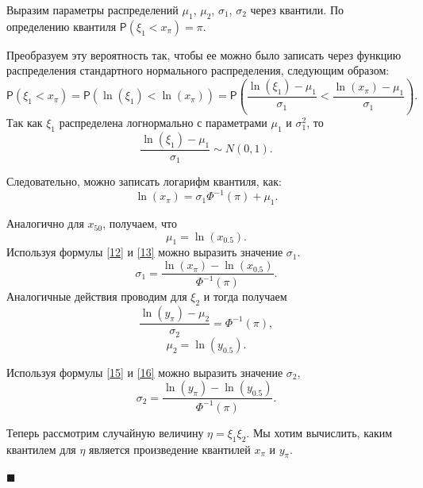 \documentclass[12pt]{article}
\newenvironment{Proof}{\par\noindent{\bf Доказательство.}}{\hfill$\scriptstyle\blacksquare$}
\begin{document}
	\begin{Proof}
		Выразим параметры распределений $\mu_{1}$, $\mu_{2}$, $\sigma_{1}$, $\sigma_{2}$ через квантили.
		По определению квантиля $\mathsf{P}(\xi_{1}<x_{\pi}) = \pi$.
		
		Преобразуем эту вероятность так, чтобы ее можно было записать через функцию распределения стандартного нормального распределения, следующим образом:
		\begin{equation*}
			\mathsf{P}(\xi_{1}<x_{\pi}) = \mathsf{P}(\ln(\xi_{1})<\ln(x_{\pi})) = \mathsf{P}\left(\dfrac{\ln(\xi_{1})-\mu_{1}}{\sigma_{1}} < \frac{\ln(x_{\pi})-\mu_{1}}{\sigma_{1}}\right).
		\end{equation*}
		Так как $\xi_{1}$ распределена логнормально с параметрами $\mu_{1}$ и $\sigma_{1}^{2}$, то \[\dfrac{\ln(\xi_{1})-\mu_{1}}{\sigma_{1}} \sim N(0,1).\]
		
		Следовательно, можно записать логарифм квантиля, как:
		\begin{equation}
			\ln(x_{\pi})=\sigma_{1}\Phi^{-1}(\pi)+\mu_{1}.\label{12}
		\end{equation}
		
		Аналогично для $x_{50}$, получаем, что 
		\begin{equation}
			\mu_{1}=\ln(x_{0.5}).\label{13}
		\end{equation}
		Используя формулы \eqref{12} и \eqref{13} можно выразить значение $\sigma_{1}$.
		\begin{equation}
			\sigma_{1}=\frac{\ln(x_{\pi})-\ln(x_{0.5})}{\Phi^{-1}(\pi)}.\label{14}
		\end{equation}
		Аналогичные действия проводим для $\xi_{2}$ и тогда получаем
		\begin{equation}
			\frac{\ln(y_{\pi})-\mu_{2}}{\sigma_{2}}=\Phi^{-1}(\pi),\label{15}
		\end{equation}
		\begin{equation}
			\mu_{2}=\ln(y_{0.5}).\label{16}
		\end{equation}
		
		Используя формулы \eqref{15} и \eqref{16} можно выразить значение $\sigma_{2}$,
		\begin{equation}
			\displaystyle{\sigma_{2}=\frac{\ln(y_{\pi})-\ln(y_{0.5})}{\Phi^{-1}(\pi)}.\label{17}}
		\end{equation}
		
		Теперь рассмотрим случайную величину $\eta = \xi_{1}\xi_{2}$. Мы хотим вычислить, каким квантилем для $\eta$ является произведение квантилей $x_{\pi}$ и $y_{\pi}$. 
		

\end{Proof}
\end{document}
